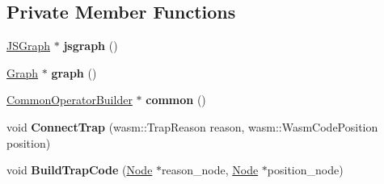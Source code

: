 \subsection*{Private Member Functions}
\begin{DoxyCompactItemize}
\item 
\hyperlink{classv8_1_1internal_1_1compiler_1_1_j_s_graph}{J\+S\+Graph} $\ast$ {\bfseries jsgraph} ()\hypertarget{classv8_1_1internal_1_1compiler_1_1_wasm_trap_helper_a30f4c54faafa5dd2660eff6a859c77d1}{}\label{classv8_1_1internal_1_1compiler_1_1_wasm_trap_helper_a30f4c54faafa5dd2660eff6a859c77d1}

\item 
\hyperlink{classv8_1_1internal_1_1compiler_1_1_graph}{Graph} $\ast$ {\bfseries graph} ()\hypertarget{classv8_1_1internal_1_1compiler_1_1_wasm_trap_helper_a8ddfbb19d08c0f24fe1bc122127830f8}{}\label{classv8_1_1internal_1_1compiler_1_1_wasm_trap_helper_a8ddfbb19d08c0f24fe1bc122127830f8}

\item 
\hyperlink{classv8_1_1internal_1_1compiler_1_1_common_operator_builder}{Common\+Operator\+Builder} $\ast$ {\bfseries common} ()\hypertarget{classv8_1_1internal_1_1compiler_1_1_wasm_trap_helper_ac447b031d9477bc8ccbd48f8af381987}{}\label{classv8_1_1internal_1_1compiler_1_1_wasm_trap_helper_ac447b031d9477bc8ccbd48f8af381987}

\item 
void {\bfseries Connect\+Trap} (wasm\+::\+Trap\+Reason reason, wasm\+::\+Wasm\+Code\+Position position)\hypertarget{classv8_1_1internal_1_1compiler_1_1_wasm_trap_helper_a8a1918cea442c5ce663fcf22d87ea08a}{}\label{classv8_1_1internal_1_1compiler_1_1_wasm_trap_helper_a8a1918cea442c5ce663fcf22d87ea08a}

\item 
void {\bfseries Build\+Trap\+Code} (\hyperlink{classv8_1_1internal_1_1compiler_1_1_node}{Node} $\ast$reason\+\_\+node, \hyperlink{classv8_1_1internal_1_1compiler_1_1_node}{Node} $\ast$position\+\_\+node)\hypertarget{classv8_1_1internal_1_1compiler_1_1_wasm_trap_helper_a4b1144efff3871c1cd63099f0bfcb50a}{}\label{classv8_1_1internal_1_1compiler_1_1_wasm_trap_helper_a4b1144efff3871c1cd63099f0bfcb50a}

\end{DoxyCompactItemize}
